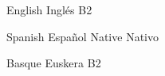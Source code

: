 	{}
	{}

\begin{cvskills}
	
	\cvskill
		{
			{English}
			{Inglés}
		} %
		{B2} %
	
	\cvskill
		{
			{Spanish}
			{Español}
		} %
		{
			{Native}
			{Nativo}
		} %
	
	\cvskill
		{
			{Basque}
			{Euskera}
		} %
		{B2} %

\end{cvskills}